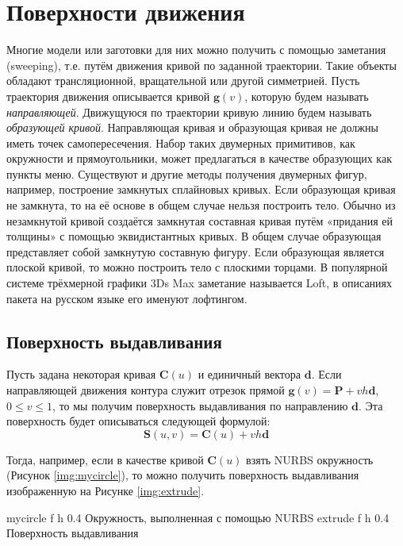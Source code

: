\documentclass{bmstu}
\begin{document}
\chapter{Поверхности движения}

Многие модели или заготовки для них можно получить с помощью
заметания (sweeping), т.е. путём движения кривой по заданной
траектории. Такие объекты обладают трансляционной, вращательной или
другой симметрией. Пусть траектория движения описывается кривой $\mathbf{g}(v)$, которую будем называть \textit{направляющей}. Движущуюся по траектории кривую линию будем называть \textit{образующей кривой}. Направляющая кривая и образующая кривая не должны иметь точек самопересечения. Набор таких двумерных примитивов, как окружности и прямоугольники, может предлагаться в качестве образующих как пункты меню. Существуют и другие методы получения двумерных фигур, например, построение замкнутых сплайновых кривых.
Если образующая кривая не замкнута, то на её основе в общем случае
нельзя построить тело. Обычно из незамкнутой кривой создаётся
замкнутая составная кривая путём «придания ей толщины» с помощью
эквидистантных кривых. В общем случае образующая представляет собой
замкнутую составную фигуру. Если образующая является плоской кривой,
то можно построить тело с плоскими торцами.
В популярной системе трёхмерной графики 3Ds Max заметание называется
Loft, в описаниях пакета на русском языке его именуют лофтингом.
\section{Поверхность выдавливания}

Пусть задана некоторая кривая $\mathbf{C}(u)$ и единичный вектора $\mathbf{d}$. Если направляющей движения контура служит отрезок прямой $\mathbf{g}(v) = \mathbf{P} + vh\mathbf{d}$, $0\le v \le 1$, то мы получим поверхность выдавливания по направлению $\mathbf{d}$. Эта поверхность будет описываться следующей формулой:
\begin{equation}
    \mathbf{S}(u,v) = \mathbf{C}(u)+vh\mathbf{d}
\end{equation}

Тогда, например, если в качестве кривой $\mathbf{C}(u)$ взять NURBS окружность (Рисунок \ref{img:mycircle}), то можно получить поверхность выдавливания изображенную на Рисунке \ref{img:extrude}.

{mycircle} %
{f} %
{h} %
{0.4\textwidth} %
{Окружность, выполненная с помощью NURBS} %
{extrude} %
{f} %
{h} %
{0.4\textwidth} %
{Поверхность выдавливания} %
\end{document}

